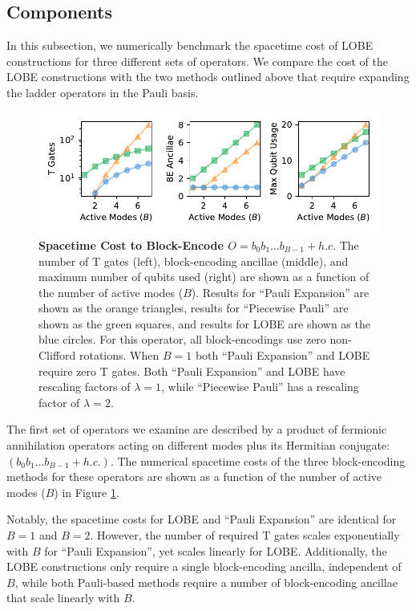 
\subsection{Components}

In this subsection, we numerically benchmark the spacetime cost of LOBE constructions for three different sets of operators.
We compare the cost of the LOBE constructions with the two methods outlined above that require expanding the ladder operators in the Pauli basis.

\begin{figure}
    \centering
    \includegraphics[width=14cm]{figures/fermionic-hc-comparison.pdf}
    \caption{
        \textbf{Spacetime Cost to Block-Encode $O = b_0 b_1 \hdots b_{B-1} + h.c.$}
        The number of T gates (left), block-encoding ancillae (middle), and maximum number of qubits used (right) are shown as a function of the number of active modes ($B$).
        Results for ``Pauli Expansion'' are shown as the orange triangles, results for ``Piecewise Pauli'' are shown as the green squares, and results for LOBE are shown as the blue circles.
        For this operator, all block-encodings use zero non-Clifford rotations.
        When $B = 1$ both ``Pauli Expansion'' and LOBE require zero T gates.
        Both ``Pauli Expansion'' and LOBE have rescaling factors of $\lambda = 1$, while ``Piecewise Pauli'' has a rescaling factor of $\lambda = 2$.
    }
    \label{fig:fermionic-hc-comparison}
\end{figure}

The first set of operators we examine are described by a product of fermionic annihilation operators acting on different modes plus its Hermitian conjugate: $(b_0 b_1 \hdots b_{B-1} + h.c.)$.
The numerical spacetime costs of the three block-encoding methods for these operators are shown as a function of the number of active modes ($B$) in Figure \ref{fig:fermionic-hc-comparison}.

Notably, the spacetime costs for LOBE and ``Pauli Expansion'' are identical for $B = 1$ and $B = 2$.
However, the number of required T gates scales exponentially with $B$ for ``Pauli Expansion'', yet scales linearly for LOBE.
Additionally, the LOBE constructions only require a single block-encoding ancilla, independent of $B$, while both Pauli-based methods require a number of block-encoding ancillae that scale linearly with $B$.

